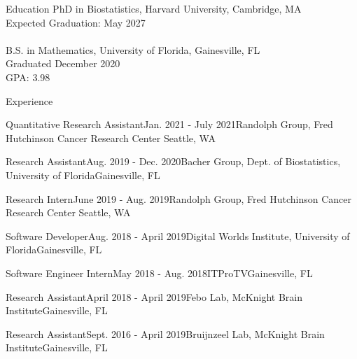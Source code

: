 \documentclass{resume}
\begin{document}
 
 
\begin{rSection}{Education}
  PhD in Biostatistics, Harvard University, Cambridge, MA \\
  Expected Graduation: May 2027 \\
  \\
B.S. in Mathematics, University of Florida, Gainesville, FL \\
Graduated December 2020 \\
GPA: 3.98

\end{rSection}


\begin{rSection}{Experience}

\begin{rSubsectionEmpty}{Quantitative Research Assistant}{Jan. 2021 - July 2021}{Randolph
    Group, Fred Hutchinson Cancer Research Center}
{Seattle, WA}
\end{rSubsectionEmpty}

\begin{rSubsectionEmpty}{Research Assistant}{Aug. 2019 - Dec. 2020}{Bacher Group, Dept. of
Biostatistics, University of Florida}{Gainesville, FL}
\end{rSubsectionEmpty}

\begin{rSubsectionEmpty}{Research Intern}{June 2019 - Aug. 2019}{Randolph
    Group, Fred Hutchinson Cancer Research Center}
{Seattle, WA}
\end{rSubsectionEmpty}

\begin{rSubsectionEmpty}{Software Developer}{Aug. 2018 - April 2019}{Digital Worlds Institute, University of Florida}{Gainesville, FL}
\end{rSubsectionEmpty}

\begin{rSubsectionEmpty}{Software Engineer Intern}{May 2018 - Aug. 2018}{ITProTV}{Gainesville, FL}
\end{rSubsectionEmpty} 

\begin{rSubsectionEmpty}{Research Assistant}{April 2018 - April 2019}{Febo Lab, McKnight Brain Institute}{Gainesville, FL}
\end{rSubsectionEmpty}

\begin{rSubsectionEmpty}{Research Assistant}{Sept. 2016 - April 2019}{Bruijnzeel Lab, McKnight Brain Institute}{Gainesville, FL}
     \end{rSubsectionEmpty}
     
\end{rSection}
\end{document}
